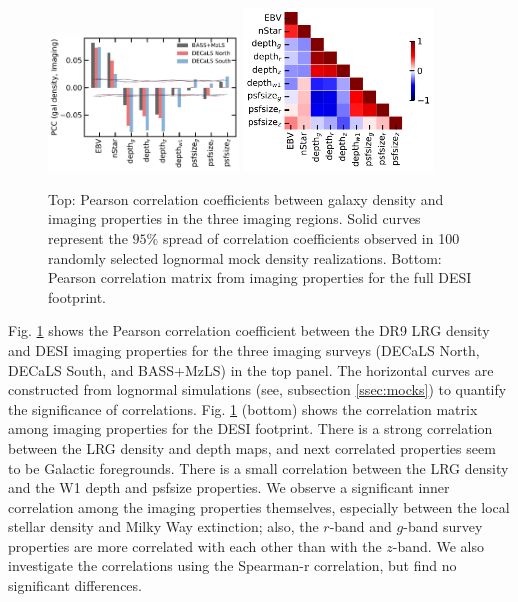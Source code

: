 \begin{figure}
 \includegraphics[width=0.45\textwidth]{figures/pcc.pdf} 
 \includegraphics[width=0.45\textwidth]{figures/pccx.pdf}  
 \caption{Top: Pearson correlation coefficients between galaxy density and imaging properties in the three imaging regions. Solid curves represent the $95\%$ spread of correlation coefficients observed in 100 randomly selected lognormal mock density realizations. Bottom: Pearson correlation matrix from imaging properties for the full DESI footprint.}
 \label{fig:pcc}
\end{figure}



Fig. \ref{fig:pcc} shows the Pearson correlation coefficient between the DR9 LRG density and DESI imaging properties for the three imaging surveys (DECaLS North, DECaLS South, and BASS+MzLS) in the top panel. The horizontal curves are constructed from lognormal simulations (see, subsection \ref{ssec:mocks}) to quantify the significance of correlations. Fig. \ref{fig:pcc} (bottom) shows the correlation matrix among imaging properties for the DESI footprint. There is a strong correlation between the LRG density and depth maps, and next correlated properties seem to be Galactic foregrounds. There is a small correlation between the LRG density and the W1 depth and psfsize properties. We observe a significant inner correlation among the imaging properties themselves, especially between the local stellar density and Milky Way extinction; also, the $r$-band and $g$-band survey properties are more correlated with each other than with the $z$-band. We also investigate the correlations using the Spearman-r correlation, but find no significant differences.

